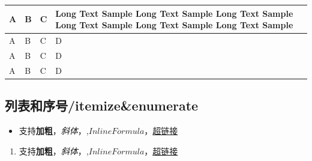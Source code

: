 \documentclass[UTF8]{ctexart}
\newenvironment{marktext}{}{}
\newlength\tablewidth
\begin{document}
\begin{center}
\setlength\tablewidth{\dimexpr (\textwidth -8\tabcolsep)}
\begin{tabular}{|p{0.077\tablewidth}<{\centering}|p{0.077\tablewidth}<{\centering}|p{0.077\tablewidth}<{\centering}|p{0.769\tablewidth}<{\centering}|}
\hline
\rowcolor{tabletopgray}
\textbf{A}&\textbf{B}&\textbf{C}&\textbf{Long Text Sample Long Text Sample Long Text Sample Long Text Sample Long Text Sample Long Text Sample }\\
\hline
A&B&C&D\\
\hline
A&B&C&D\\
\hline
A&B&C&D\\
\hline
\end{tabular}
\end{center}
\begin{marktext}


\subsection{列表和序号/itemize\&enumerate}


\end{marktext}
\begin{itemize}
\item
支持\textbf{加粗}，\textit{斜体}，,$Inline Formula$，\href{http:///www.github.com}{超链接}
\end{itemize}


\begin{enumerate}
\item
支持\textbf{加粗}，\textit{斜体}，,$Inline Formula$，\href{http:///www.github.com}{超链接}
\end{enumerate}
\end{document}
